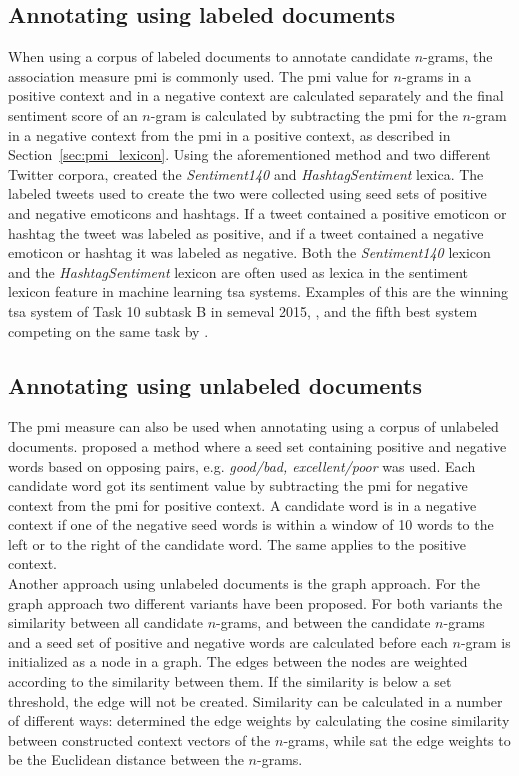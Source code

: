 \subsection*{Annotating using labeled documents}
When using a corpus of labeled documents to annotate candidate $n$-grams, the association measure \ac{pmi} is commonly used. The \ac{pmi} value for $n$-grams in a positive context and in a negative context are calculated separately and the final sentiment score of an $n$-gram is calculated by subtracting the \ac{pmi} for the $n$-gram in a negative context from the \ac{pmi} in a positive context, as described in Section~\ref{sec:pmi_lexicon}. Using the aforementioned method and two different Twitter corpora, \cite{MohammadKZ2013} created the \textit{Sentiment140} and \textit{HashtagSentiment} lexica. The labeled tweets used to create the two were collected using seed sets of positive and negative emoticons and hashtags. If a tweet contained a positive emoticon or hashtag the tweet was labeled as positive, and if a tweet contained a negative emoticon or hashtag it was labeled as negative. Both the \textit{Sentiment140} lexicon and the \textit{HashtagSentiment} lexicon are often used as lexica in the sentiment lexicon feature in machine learning \ac{tsa} systems. Examples of this are the winning \ac{tsa} system of Task 10 subtask B in \ac{semeval} 2015, \cite{Webis15}, and the fifth best system competing on the same task by \cite{Splusplus15}.


\subsection*{Annotating using unlabeled documents}
The \ac{pmi} measure can also be used when annotating using a corpus of unlabeled documents. \cite{turneylittman2002} proposed a method where a seed set containing positive and negative words based on opposing pairs, e.g. \textit{good/bad, excellent/poor} was used. Each candidate word got its sentiment value by subtracting the \ac{pmi} for negative context from the \ac{pmi} for positive context. A candidate word is in a negative context if one of the negative seed words is within a window of 10 words to the left or to the right of the candidate word. The same applies to the positive context. \\

Another approach using unlabeled documents is the graph approach. For the graph approach two different variants have been proposed. For both variants the similarity between all candidate $n$-grams, and between the candidate $n$-grams and a seed set of positive and negative words are calculated before each $n$-gram is initialized as a node in a graph. The edges between the nodes are weighted according to the similarity between them. If the similarity is below a set threshold, the edge will not be created. Similarity can be calculated in a number of different ways: \cite{Velikovich2010} determined the edge weights by calculating the cosine similarity between constructed context vectors of the $n$-grams, while \cite{Zhu02learningfrom} sat the edge weights to be the Euclidean distance between the $n$-grams.\\  

